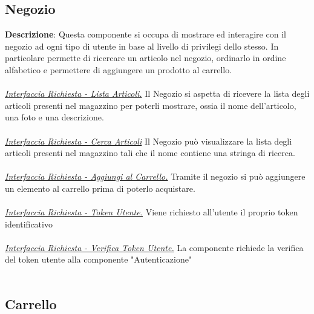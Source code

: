 \documentclass{report}
\begin{document}
\subsection*{Negozio}
\textbf{Descrizione}: Questa componente si occupa di mostrare  ed interagire con il negozio ad ogni tipo di utente in base al livello di privilegi dello stesso. In particolare permette di ricercare un articolo nel negozio, ordinarlo in ordine alfabetico e permettere di aggiungere un prodotto al carrello.
\\
\\
\uline{\textit{Interfaccia Richiesta - Lista Articoli.}} Il Negozio si aspetta di ricevere la lista degli articoli presenti nel magazzino per poterli mostrare, ossia il nome dell'articolo, una foto e una descrizione. \\ \\
\uline{\textit{Interfaccia Richiesta - Cerca Articoli}}
Il Negozio può visualizzare la lista degli articoli presenti nel magazzino tali che il nome contiene una stringa di ricerca.\\\\
\uline{\textit{Interfaccia Richiesta - Aggiungi al Carrello.}} Tramite il negozio si può aggiungere un elemento al carrello prima di poterlo acquistare. \\ \\
\uline{\textit{Interfaccia Richiesta - Token Utente.}} 
Viene richiesto all'utente il proprio token identificativo\\ \\
\uline{\textit{Interfaccia Richiesta - Verifica Token Utente.}} 
La componente richiede la verifica del token utente alla componente "Autenticazione"\\\\

\subsection*{Carrello}
\end{document}
